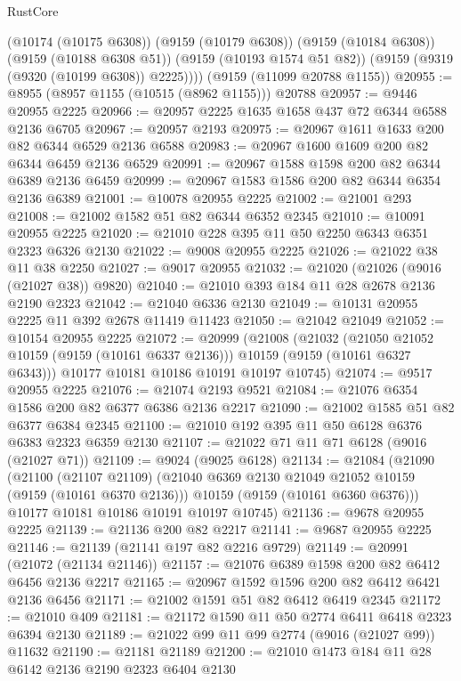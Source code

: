 \begin{lexlean}{RustCore}
\begin{coremodule}
        (@10174 (@10175 @6308))
        (@9159 (@10179 @6308))
        (@9159 (@10184 @6308))
        (@9159 (@10188 @6308 @51))
        (@9159 (@10193 @1574 @51 @82))
        (@9159 (@9319 (@9320 (@10199 @6308)) @2225))))
    (@9159 (@11099 @20788 @1155))
@20955 := @8955 (@8957 @1155 (@10515 (@8962 @1155))) @20788
@20957 := @9446 @20955 @2225
@20966 := @20957 @2225 @1635 @1658 @437 @72 @6344 @6588 @2136 @6705
@20967 := @20957 @2193
@20975 := @20967 @1611 @1633 @200 @82 @6344 @6529 @2136 @6588
@20983 := @20967 @1600 @1609 @200 @82 @6344 @6459 @2136 @6529
@20991 := @20967 @1588 @1598 @200 @82 @6344 @6389 @2136 @6459
@20999 := @20967 @1583 @1586 @200 @82 @6344 @6354 @2136 @6389
@21001 := @10078 @20955 @2225
@21002 := @21001 @293
@21008 := @21002 @1582 @51 @82 @6344 @6352 @2345
@21010 := @10091 @20955 @2225
@21020 := @21010 @228 @395 @11 @50 @2250 @6343 @6351 @2323 @6326 @2130
@21022 := @9008 @20955 @2225
@21026 := @21022 @38 @11 @38 @2250
@21027 := @9017 @20955
@21032 := @21020 (@21026 (@9016 (@21027 @38)) @9820)
@21040 := @21010 @393 @184 @11 @28 @2678 @2136 @2190 @2323
@21042 := @21040 @6336 @2130
@21049 := @10131 @20955 @2225 @11 @392 @2678 @11419 @11423
@21050 := @21042 @21049
@21052 := @10154 @20955 @2225
@21072 := @20999
    (@21008
      (@21032
        (@21050 @21052 @10159 (@9159 (@10161 @6337 @2136)))
        @10159
        (@9159 (@10161 @6327 @6343)))
      @10177
      @10181
      @10186
      @10191
      @10197
      @10745)
@21074 := @9517 @20955 @2225
@21076 := @21074 @2193 @9521
@21084 := @21076 @6354 @1586 @200 @82 @6377 @6386 @2136 @2217
@21090 := @21002 @1585 @51 @82 @6377 @6384 @2345
@21100 := @21010 @192 @395 @11 @50 @6128 @6376 @6383 @2323 @6359 @2130
@21107 := @21022 @71 @11 @71 @6128 (@9016 (@21027 @71))
@21109 := @9024 (@9025 @6128)
@21134 := @21084
    (@21090
      (@21100
        (@21107 @21109)
        (@21040 @6369 @2130 @21049 @21052 @10159 (@9159 (@10161 @6370 @2136)))
        @10159
        (@9159 (@10161 @6360 @6376)))
      @10177
      @10181
      @10186
      @10191
      @10197
      @10745)
@21136 := @9678 @20955 @2225
@21139 := @21136 @200 @82 @2217
@21141 := @9687 @20955 @2225
@21146 := @21139 (@21141 @197 @82 @2216 @9729)
@21149 := @20991 (@21072 (@21134 @21146))
@21157 := @21076 @6389 @1598 @200 @82 @6412 @6456 @2136 @2217
@21165 := @20967 @1592 @1596 @200 @82 @6412 @6421 @2136 @6456
@21171 := @21002 @1591 @51 @82 @6412 @6419 @2345
@21172 := @21010 @409
@21181 := @21172 @1590 @11 @50 @2774 @6411 @6418 @2323 @6394 @2130
@21189 := @21022 @99 @11 @99 @2774 (@9016 (@21027 @99)) @11632
@21190 := @21181 @21189
@21200 := @21010 @1473 @184 @11 @28 @6142 @2136 @2190 @2323 @6404 @2130

\end{coremodule}
\end{lexlean}
